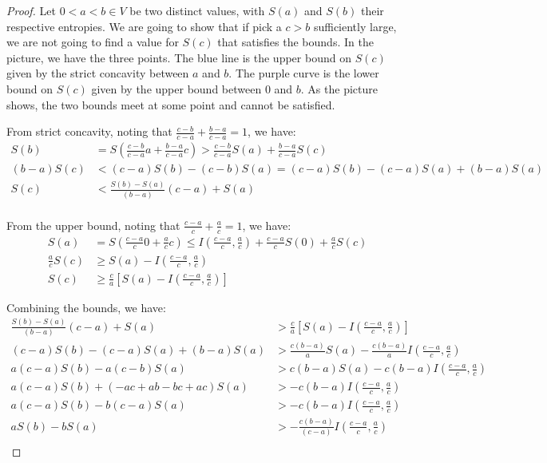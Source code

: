 \begin{proof}
	Let $0 < a < b \in V$ be two distinct values, with $S(a)$ and $S(b)$ their respective entropies. We are going to show that if pick a $c > b$ sufficiently large, we are not going to find a value for $S(c)$ that satisfies the bounds. In the picture, we have the three points. The blue line is the upper bound on $S(c)$ given by the strict concavity between $a$ and $b$. The purple curve is the lower bound on $S(c)$ given by the upper bound between $0$ and $b$. As the picture shows, the two bounds meet at some point and cannot be satisfied.
	
	From strict concavity, noting that $\frac{c-b}{c-a} + \frac{b-a}{c-a} = 1$, we have:
	\begin{equation}
		\begin{aligned}
			S(b) &= S\left(\frac{c-b}{c-a} a + \frac{b-a}{c-a} c\right) > \frac{c-b}{c-a} S(a) + \frac{b-a}{c-a} S(c)\\
			(b-a)S(c) &< (c-a) S(b) - (c-b) S(a) = (c-a) S(b) - (c-a) S(a) + (b-a) S(a) \\
			S(c) &< \frac{S(b) - S(a)}{(b-a)} (c-a) + S(a) \\
		\end{aligned}
	\end{equation}
	
	From the upper bound, noting that $\frac{c-a}{c} + \frac{a}{c} = 1$, we have:
	\begin{equation}
		\begin{aligned}
			S(a) &= S\left(\frac{c-a}{c} 0 + \frac{a}{c} c\right) \leq I\left(\frac{c-a}{c}, \frac{a}{c}\right) + \frac{c-a}{c} S(0) +\frac{a}{c} S(c) \\
			\frac{a}{c} S(c) &\geq S(a) - I\left(\frac{c-a}{c}, \frac{a}{c}\right) \\
			S(c) &\geq \frac{c}{a} \left[ S(a) - I\left(\frac{c-a}{c}, \frac{a}{c}\right) \right]
		\end{aligned}
	\end{equation}
	
	Combining the bounds, we have:
	\begin{equation}
		\begin{aligned}
			\frac{S(b) - S(a)}{(b-a)} (c-a) + S(a) &> \frac{c}{a} \left[ S(a) - I\left(\frac{c-a}{c}, \frac{a}{c}\right) \right] \\
			(c-a) S(b) - (c-a)S(a) + (b-a) S(a) &> \frac{c(b-a)}{a} S(a) - \frac{c(b-a)}{a} I\left(\frac{c-a}{c}, \frac{a}{c}\right) \\
			a (c-a) S(b) - a(c-b) S(a) &> c(b-a)S(a) - c(b-a) I\left(\frac{c-a}{c}, \frac{a}{c}\right) \\
			a (c-a) S(b) + (-ac +ab -bc +ac) S(a) &> - c(b-a) I\left(\frac{c-a}{c}, \frac{a}{c}\right) \\
			a (c-a) S(b) -b (c-a) S(a) &> - c(b-a) I\left(\frac{c-a}{c}, \frac{a}{c}\right) \\
			a  S(b) - b S(a) &> - \frac{c(b-a)}{(c-a)} I\left(\frac{c-a}{c}, \frac{a}{c}\right) \\
		\end{aligned}
	\end{equation}
	

\end{proof}
